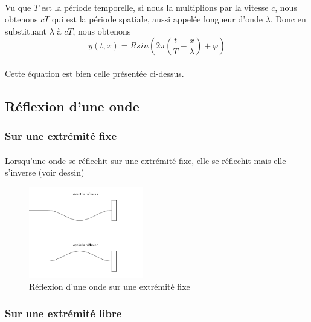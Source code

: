 \documentclass[a4paper]{article}
\begin{document}
\paragraph{}Vu que $T$ est la période temporelle, si nous la multiplions par la vitesse $c$, nous obtenons $cT$ qui est la période spatiale, aussi appelée longueur d'onde $\lambda$. Donc en substituant $\lambda$ à $cT$, nous obtenons
\[y(t,x)=Rsin\left(2\pi \left(\frac{t}{T}-\frac{x}{\lambda}\right)+\varphi\right)\]
\paragraph{}Cette équation est bien celle présentée ci-dessus.
\subsection{Réflexion d'une onde}
\subsubsection{Sur une extrémité fixe}
\paragraph{}Lorsqu'une onde se réflechit sur une extrémité fixe, elle se réflechit mais elle s'inverse (voir dessin)
\begin{figure}
\begin{center}
\includegraphics[width=5cm]{imgs/reflfixe.png}
\end{center}
\caption{Réflexion d'une onde sur une extrémité fixe}
\label{Réflexion d'une onde sur une extrémité fixe}
\end{figure}
\subsubsection{Sur une extrémité libre}
\end{document}
